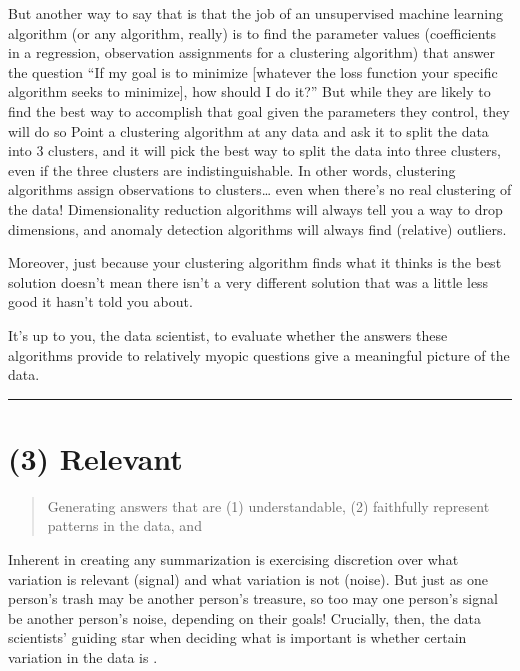 \documentclass[letterpaper,10pt,english]{jupyterBook}
\begin{document}
\sphinxAtStartPar
But another way to say that is that the job of an unsupervised machine learning algorithm (or any algorithm, really) is to find the parameter values (coefficients in a regression, observation assignments for a clustering algorithm) that answer the question “If my goal is to minimize {[}whatever the loss function your specific algorithm seeks to minimize{]}, how should I do it?” But while they are likely to find the best way to accomplish that goal given the parameters they control, they will do so  Point a clustering algorithm at any data and ask it to split the data into 3 clusters, and it will pick the best way to split the data into three clusters, even if the three clusters are  indistinguishable. In other words, clustering algorithms assign observations to clusters… even when there’s no real clustering of the data! Dimensionality reduction algorithms will always tell you a way to drop dimensions, and anomaly detection algorithms will always find (relative) outliers.

\sphinxAtStartPar
Moreover, just because your clustering algorithm finds what it thinks is the best solution doesn’t mean there isn’t a  very different solution that was  a little less good it hasn’t told you about.

\sphinxAtStartPar
It’s up to you, the data scientist, to evaluate whether the answers these algorithms provide to relatively myopic questions give a meaningful picture of the data.


\bigskip\hrule\bigskip


\sphinxstepscope


\section{(3) Relevant}
\label{\detokenize{30_questions/19_exploratory_internal_meaningful:relevant}}\label{\detokenize{30_questions/19_exploratory_internal_meaningful::doc}}\begin{quote}

\sphinxAtStartPar
Generating answers that are (1) understandable, (2) faithfully represent patterns in the data, and 
\end{quote}

\sphinxAtStartPar
Inherent in creating any summarization is exercising discretion over what variation is relevant (signal) and what variation is not (noise). But just as one person’s trash may be another person’s treasure, so too may one person’s signal be another person’s noise, depending on their goals! Crucially, then, the data scientists’ guiding star when deciding what is important is whether certain variation in the data is .
\end{document}

